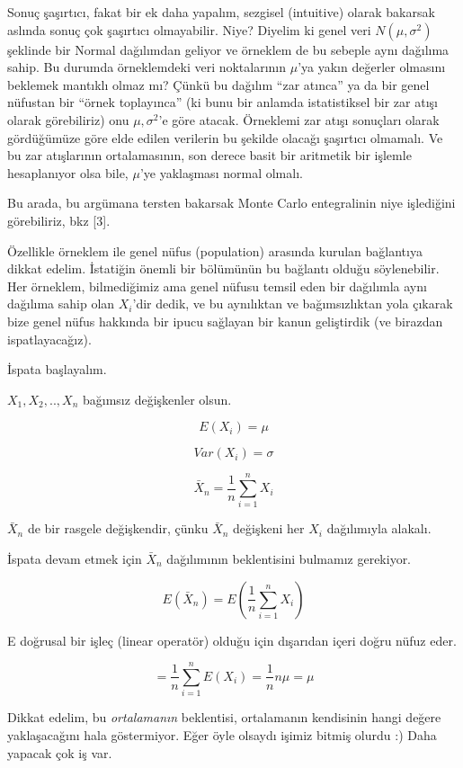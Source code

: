 \documentclass[12pt,fleqn]{article}\usepackage{../../common}
\begin{document}
Sonuç şaşırtıcı, fakat bir ek daha yapalım, sezgisel (intuitive) olarak
bakarsak aslında sonuç çok şaşırtıcı olmayabilir. Niye? Diyelim ki genel
veri $N(\mu,\sigma^2)$ şeklinde bir Normal dağılımdan geliyor ve örneklem
de bu sebeple aynı dağılıma sahip. Bu durumda örneklemdeki veri
noktalarının $\mu$'ya yakın değerler olmasını beklemek mantıklı olmaz mı?
Çünkü bu dağılım ``zar atınca'' ya da bir genel nüfustan bir ``örnek
toplayınca'' (ki bunu bir anlamda istatistiksel bir zar atışı olarak
görebiliriz) onu $\mu,\sigma^2$'e göre atacak. Örneklemi zar atışı
sonuçları olarak gördüğümüze göre elde edilen verilerin bu şekilde olacağı
şaşırtıcı olmamalı. Ve bu zar atışlarının ortalamasının, son derece basit
bir aritmetik bir işlemle hesaplanıyor olsa bile, $\mu$'ye yaklaşması
normal olmalı.

Bu arada, bu argümana tersten bakarsak Monte Carlo entegralinin niye
işlediğini görebiliriz, bkz [3].

Özellikle örneklem ile genel nüfus (population) arasında kurulan bağlantıya
dikkat edelim. İstatiğin önemli bir bölümünün bu bağlantı olduğu
söylenebilir. Her örneklem, bilmediğimiz ama genel nüfusu temsil eden bir
dağılımla aynı dağılıma sahip olan $X_i$'dir dedik, ve bu aynılıktan ve
bağımsızlıktan yola çıkarak bize genel nüfus hakkında bir ipucu sağlayan
bir kanun geliştirdik (ve birazdan ispatlayacağız).

İspata başlayalım.

$X_1,X_2,..,X_n$ bağımsız değişkenler olsun. 

$$ E(X_i) = \mu $$

$$ Var(X_i) = \sigma $$

$$ \bar{X}_n = \frac{1}{n} \sum_{i=1}^n X_i  $$

$\bar{X}_n$ de bir rasgele değişkendir, çünku $\bar{X}_n$ değişkeni her
$X_i$ dağılımıyla alakalı.

İspata devam etmek için $\bar{X}_n$ dağılımının beklentisini bulmamız gerekiyor.

$$ E(\bar{X}_n) = E(\frac{1}{n} \sum_{i=1}^n X_i)  $$

E doğrusal bir işleç (linear operatör) olduğu için dışarıdan içeri doğru
nüfuz eder. 

$$ = \frac{1}{n} \sum_{i=1}^n E(X_i) = \frac{1}{n}n\mu = \mu $$

Dikkat edelim, bu {\em ortalamanın} beklentisi, ortalamanın kendisinin
hangi değere yaklaşacağını hala göstermiyor. Eğer öyle olsaydı işimiz
bitmiş olurdu :) Daha yapacak çok iş var.
\end{document}
